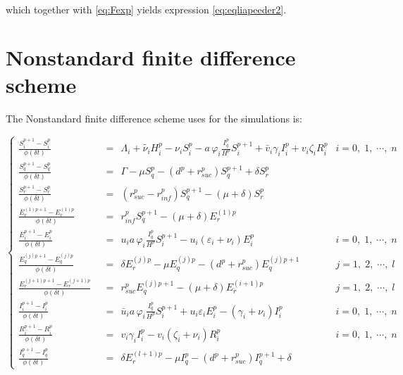 \documentclass[a4paper]{article}
\newcommand{\varphiVar}{r_{inf}}
\newcommand{\varpiVar}{r_{suc}}
\newcommand{\miVar}{\varphi_i}
\begin{document}
{\begin{equation*}
\begin{array}{rcl}
\end{array}
\end{equation*}
which together with \eqref{eq:Fexp} yields expression \eqref{eq:eqliapeeder2}.

\section{Nonstandard finite difference scheme}\label{subsec.nsfd}
The Nonstandard finite difference scheme uses for the simulations is:

\begin{equation}
   \left\{
    \begin{aligned}
    	\frac{S^{p+1}_i - S^{p}_i}{\phi(\delta t)} &~~=~~\Lambda_i+\widetilde{\nu_i}H^{p}_i - \nu_iS^{p}_i- a\,\miVar \frac{I^{p}_q}{H^{p}}S^{p+1}_i +\bar v_i\gamma_i I^{p}_i  + v_i\zeta_i R^{p}_i & i = 0,\;1,\;\cdots,\; n \\%
        \frac{S^{p+1}_q - S^{p}_q}{\phi(\delta t)}&~~=~~\Gamma -\mu S^{p}_q- (d^{p}+\varpiVar ^{p}) S^{p+1}_q  + \delta S^{p}_r  & \,\\%
        \frac{S^{p+1}_r - S^{p}_r}{\phi(\delta t)}&~~=~~(\varpiVar ^{p}-\varphiVar ^p) S^{p+1}_q    -  (\mu+\delta) S^{p}_r & \,\\%
        \frac{E^{(1)p+1}_r - E^{(1)p}_r}{\phi(\delta t)}&~~=~~\varphiVar ^p  S^{p+1}_q-(\mu+\delta) E^{(1)p}_r& \,\\%
       \frac{E^{p+1}_i - E^{p}_i}{\phi(\delta t)}&~~=~~u_ia\,\miVar \frac{I^{p}_q}{H^{p}}S^{p+1}_i -u_i\left(\varepsilon_i+\nu_i\right) E^{p}_i & 
i = 0,\;1,\;\cdots,\; n \,\\%
       \frac{E^{(j)p+1}_q - E^{(j)p}_q}{\phi(\delta t)}&~~=~~\delta E^{(j)p}_r - \mu E^{(j)p}_q - (d^{p}+\varpiVar ^{p})E^{(j)p+1}_q &
j = 1,\;2,\;\cdots,\; l  \,\\%
       \frac{E^{(j+1)p+1}_r - E^{(j+1)p}_r}{\phi(\delta t)}&~~=~~\varpiVar ^{p}  E^{(j)p+1}_q-(\mu+\delta)
E^{(i+1)p}_r& j = 1,\;2,\;\cdots,\; l  \,\\%
       \frac{I^{p+1}_i - I^{p}_i}{\phi(\delta t)}&~~=~~\bar u_ia\,\miVar \frac{I^{p}_q}{H^{p}}S^{p+1}_i +u_i\varepsilon_iE^{p}_i -\left(\gamma_i+\nu_i\right) I^{p}_i & 
 i = 0,\;1,\;\cdots,\; n \,\\%
  \frac{R^{p+1}_i - R^{p}_i}{\phi(\delta t)}&~~=~~v_i\gamma_iI^{p}_i  -v_i\left(\zeta_i+\nu_i\right) R^{p}_i & 
 i = 0,\;1,\;\cdots,\; n \,\\%
       \frac{I^{p+1}_q - I^{p}_q}{\phi(\delta t)}&~~=~~\delta E^{(l+1)p}_r -\mu I^{p}_q- (d^{p}+\varpiVar ^{p}) I^{p+1}_q +\delta

\end{aligned}
\end{equation}}
\end{document}
